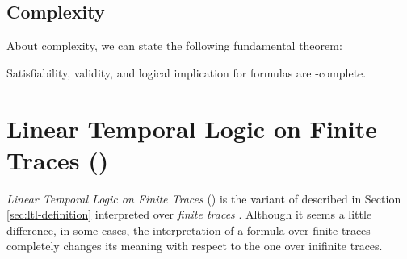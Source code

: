 \subsection{Complexity}
About \LTL complexity, we can state the following fundamental theorem:
\begin{theorem}\citep{Sistla:1985:CPL:3828.3837}
Satisfiability, validity, and logical implication for \LTL formulas are \PSPACE-complete.
\end{theorem}
\section{Linear Temporal Logic on Finite Traces (\LTLf)}
\textit{Linear Temporal Logic on Finite Traces} (\LTLf) is the variant of \LTL described in Section \ref{sec:ltl-definition} interpreted over \textit{finite traces} \citep{de2013linear}. Although it seems a little difference, in some cases, the interpretation of a formula over finite traces completely changes its meaning with respect to the one over inifinite traces.
